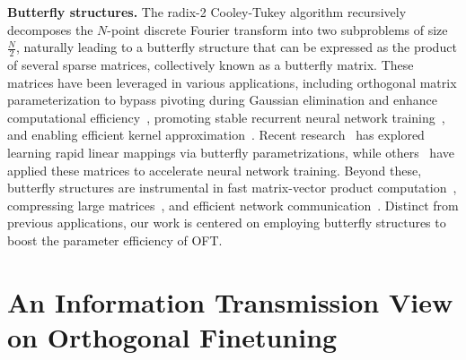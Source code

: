 \textbf{Butterfly structures.} The radix-2 Cooley-Tukey algorithm recursively decomposes the $N$-point discrete Fourier transform into two subproblems of size $\frac{N}{2}$, naturally leading to a butterfly structure that can be expressed as the product of several sparse matrices, collectively known as a butterfly matrix. These matrices have been leveraged in various applications, including orthogonal matrix parameterization to bypass pivoting during Gaussian elimination and enhance computational efficiency~\cite{parker1995random}, promoting stable recurrent neural network training~\cite{jing2017tunable}, and enabling efficient kernel approximation~\cite{munkhoeva2018quadrature}. Recent research~\cite{dao2019learning,dao2019kaleidoscope} has explored learning rapid linear mappings via butterfly parametrizations, while others~\cite{chen2022pixelated,dao2022monarch} have applied these matrices to accelerate neural network training. Beyond these, butterfly structures are instrumental in fast matrix-vector product computation~\cite{michielssen1996multilevel,o2010algorithm}, compressing large matrices~\cite{li2015butterfly}, and efficient network communication~\cite{klasing1994broadcasting,li2003linear,rajasingh2016transmission}. Distinct from previous applications, our work is centered on employing butterfly structures to boost the parameter efficiency of OFT.

\section{An Information Transmission View on Orthogonal Finetuning}

